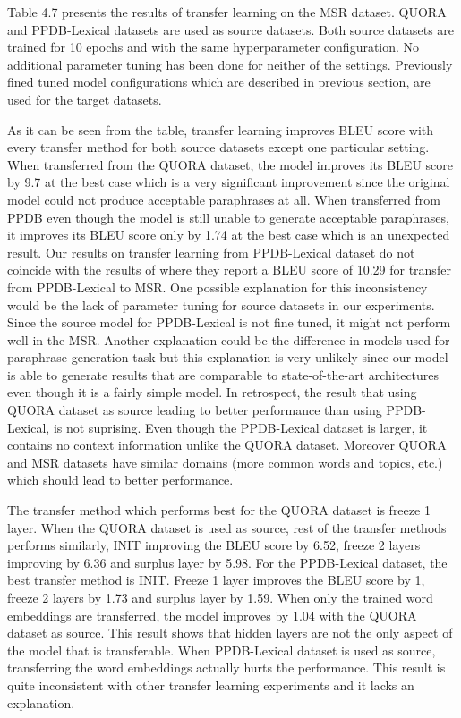 Table 4.7 presents the results of transfer learning on the MSR dataset. QUORA and PPDB-Lexical datasets are used as source datasets. Both source datasets are trained for 10 epochs and with the same hyperparameter configuration. No additional parameter tuning has been done for neither of the settings. Previously fined tuned model configurations which are described in previous section, are used for the target datasets.

As it can be seen from the table, transfer learning improves BLEU score with every transfer method for both source datasets except one particular setting. When transferred from the QUORA dataset, the model improves its BLEU score by 9.7 at the best case which is a very significant improvement since the original model could not produce acceptable paraphrases at all. When transferred from PPDB even though the model is still unable to generate acceptable paraphrases, it improves its BLEU score only by 1.74 at the best case which is an unexpected result. Our results on transfer learning from PPDB-Lexical dataset do not coincide with the results of \cite{brad} where they report a BLEU score of 10.29 for transfer from PPDB-Lexical to MSR. One possible explanation for this inconsistency would be the lack of parameter tuning for source datasets in our experiments. Since the source model for PPDB-Lexical is not fine tuned, it might not perform well in the MSR. Another explanation could be the difference in models used for paraphrase generation task but this explanation is very unlikely since our model is able to generate results that are comparable to state-of-the-art architectures even though it is a fairly simple model. In retrospect, the result that using QUORA dataset as source leading to better performance than using PPDB-Lexical, is not suprising. Even though the PPDB-Lexical dataset is larger, it contains no context information unlike the QUORA dataset. Moreover QUORA and MSR datasets have similar domains (more common words and topics, etc.) which should lead to better performance.

The transfer method which performs best for the QUORA dataset is freeze 1 layer. When the QUORA dataset is used as source, rest of the transfer methods performs similarly, INIT improving the BLEU score by 6.52, freeze 2 layers improving by 6.36 and surplus layer by 5.98. For the PPDB-Lexical dataset, the best transfer method is INIT. Freeze 1 layer improves the BLEU score by 1, freeze 2 layers by 1.73 and surplus layer by 1.59. When only the trained word embeddings are transferred, the model improves by 1.04 with the QUORA dataset as source. This result shows that hidden layers are not the only aspect of the model that is transferable. When PPDB-Lexical dataset is used as source, transferring the word embeddings actually hurts the performance. This result is quite inconsistent with other transfer learning experiments and it lacks an explanation.

